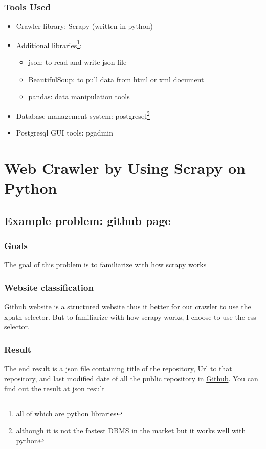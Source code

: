 \documentclass[11pt,a4paper]{report}
\begin{document}
\subsection{Tools Used}
\begin{itemize}
	\item Crawler library; Scrapy (written in python)
	\item Additional libraries\footnote{all of which are python libraries}:
	\begin{itemize}
		\item json: to read and write json file
		\item BeautifulSoup: to pull data from html or xml document
		\item pandas: data manipulation tools
	\end{itemize}
	\item Database management system: postgresql\footnote{although it is not the fastest DBMS in the market but it works well with python} 
	\item Postgresql GUI tools: pgadmin
\end{itemize} 
\chapter{Web Crawler by Using Scrapy on Python}
\newpage
\section{Example problem: github page}
	\subsection{Goals}
	The goal of this problem is to familiarize with how scrapy works
	\subsection{Website classification}
	Github website is a structured website thus it better for our crawler to use the xpath selector. But to familiarize with how scrapy works, I choose to use the css selector.
	\subsection{Result}
	The end result is a json file containing title of the repository, Url to that repository, and last modified date of all the public repository in \href{https://github.com/vietanhdev?tab=repositories}{Github}. You can find out the result at \href{https://github.com/lam1910/crawler-gr1/blob/master/github-1303-vietanh.json}{json result}
\end{document}

